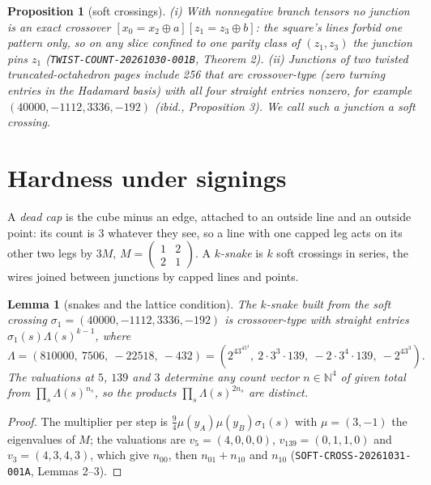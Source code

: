 \documentclass[11pt]{article}
\newtheorem{lemma}[theorem]{Lemma}
\newtheorem{proposition}[theorem]{Proposition}
\theoremstyle{definition}
\theoremstyle{remark}
\begin{document}
\begin{proposition}[soft crossings]\label{prop:soft}
(i) With nonnegative branch tensors no junction is an exact crossover
$[x_0=x_2\oplus a][z_1=z_3\oplus b]$: the square's lines forbid one pattern
only, so on any slice confined to one parity class of $(z_1,z_3)$ the junction
pins $z_1$ (\texttt{TWIST-COUNT-20261030-001B}, Theorem 2).
(ii) Junctions of two twisted truncated-octahedron pages include 256 that are
\emph{crossover-type} (zero turning entries in the Hadamard basis) with all
four straight entries nonzero, for example $(40000,-1112,3336,-192)$
(ibid., Proposition 3). We call such a junction a \emph{soft crossing}.
\end{proposition}

\section{Hardness under signings}\label{sec:C}

A \emph{dead cap} is the cube minus an edge, attached to an outside line and
an outside point: its count is 3 whatever they see, so a line with one capped
leg acts on its other two legs by $3M$, $M=\begin{pmatrix}1&2\\2&1\end{pmatrix}$.
A \emph{$k$-snake} is $k$ soft crossings in series, the wires joined between
junctions by capped lines and points.

\begin{lemma}[snakes and the lattice condition]\label{lem:snake}
The $k$-snake built from the soft crossing $\sigma_1=(40000,-1112,3336,-192)$
is crossover-type with straight entries $\sigma_1(s)\Lambda(s)^{k-1}$, where
\[
\Lambda=(810000,\ 7506,\ -22518,\ -432)=(2^43^45^4,\ 2\cdot3^3\cdot139,\ -2\cdot3^4\cdot139,\ -2^43^3).
\]
The valuations at $5$, $139$ and $3$ determine any count vector $n\in\mathbb N^4$
of given total from $\prod_s\Lambda(s)^{n_s}$, so the products
$\prod_s\Lambda(s)^{2n_s}$ are distinct.
\end{lemma}
\begin{proof}
The multiplier per step is $\tfrac94\mu(y_A)\mu(y_B)\sigma_1(s)$ with
$\mu=(3,-1)$ the eigenvalues of $M$; the valuations are $v_5=(4,0,0,0)$,
$v_{139}=(0,1,1,0)$ and $v_3=(4,3,4,3)$, which give $n_{00}$, then $n_{01}+n_{10}$
and $n_{10}$ (\texttt{SOFT-CROSS-20261031-001A}, Lemmas 2--3).
\end{proof}
\end{document}
